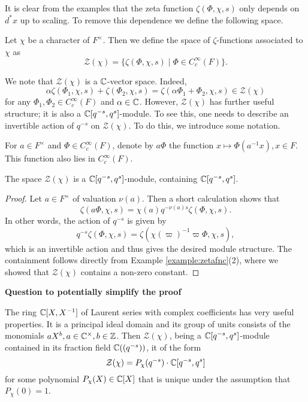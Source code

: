 It is clear from the examples that the zeta function $\zeta(\Phi,\chi,s)$ only depends on $d^*x$ up to scaling. To remove this dependence we define the following space.

\begin{defn}
    Let $\chi$ be a character of $F^\times$. Then we define the space of $\zeta$-functions associated to $\chi$ as
    $$\mathcal Z(\chi) = \{\zeta(\Phi,\chi,s) \mid \Phi \in C_c^\infty(F)\}.$$
\end{defn}

We note that $\mathcal{Z}(\chi)$ is a $\mathbb{C}$-vector space. Indeed, $$\alpha\zeta(\Phi_1,\chi,s)+\zeta(\Phi_2,\chi,s)=\zeta(\alpha\Phi_1+\Phi_2,\chi,s)\in\mathcal{Z}(\chi)$$
for any $\Phi_1,\Phi_2\in C_c^\infty(F)$ and $\alpha\in\mathbb{C}$. However, $\mathcal{Z}(\chi)$ has further useful structure; it is also a $\mathbb{C}[q^{-s},q^s]$-module. To see this, one needs to describe an invertible action of $q^{-s}$ on $\mathcal{Z}(\chi)$. To do this, we introduce some notation.

\begin{notn}
    For $a \in F^\times$ and $\Phi \in C_c^\infty(F)$, denote by $a\Phi$ the function $x \mapsto \Phi(a^{-1}x),x\in F$. This function also lies in $C_c^\infty(F)$.
\end{notn}

\begin{lemma}\label{lem:ZmodGL1}
    The space $\mathcal Z(\chi)$ is a $\mathbb{C}[q^{-s},q^s]$-module, containing $\mathbb{C}[q^{-s},q^s]$.
\end{lemma}
\begin{proof}
    Let $a \in F^\times$ of valuation $\nu(a)$. Then a short calculation shows that
    $$\zeta(a\Phi,\chi,s) = \chi(a)q^{-\nu(a)s}\zeta(\Phi,\chi,s).$$
    In other words, the action of $q^{-s}$ is given by 
    $$q^{-s}\zeta(\Phi,\chi,s)=\zeta(\chi(\varpi)^{-1}\varpi\Phi,\chi,s),$$
    which is an invertible action and thus gives the desired module structure. The containment follows directly from Example \ref{example:zetafnc}(2), where we showed that $\mathcal{Z}(\chi)$ contains a non-zero constant.
\end{proof}

\iffalse
\textbf{Question to potentially simplify the proof}

The ring $\mathbb{C}[X,X^{-1}]$ of Laurent series with complex coefficients has very useful properties. It is a principal ideal domain and its group of units consists of the monomials $aX^b,a\in\mathbb{C}^\times, b\in\mathbb{Z}$. Then $\mathcal Z(\chi)$, being a $\mathbb{C}[q^{-s},q^s]$-module contained in its fraction field $\mathbb{C}((q^{-s}))$, it of the form 
$$\mathcal{Z}(\chi)=P_\chi(q^{-s})\cdot\mathbb{C}[q^{-s},q^s]$$ for some polynomial $P_\chi(X)\in\mathbb{C}[X]$ that is unique under the assumption that $P_\chi(0)=1$.

